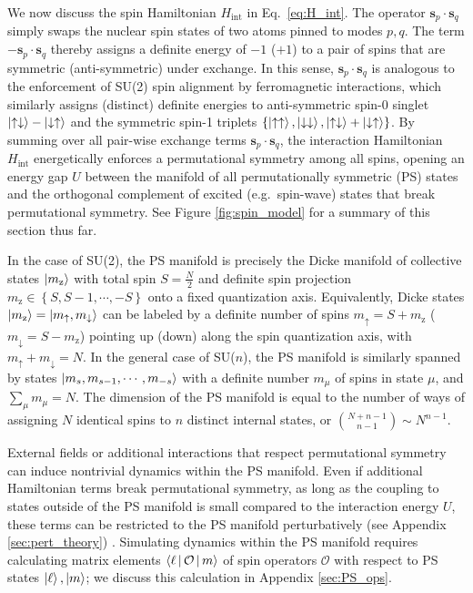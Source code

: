 \documentclass[nofootinbib,twocolumn]{revtex4-2}
\renewcommand{\t}{\text} %
\renewcommand{\set}[1]{\left\{#1\right\}} %
\newcommand{\bk}{\Braket} %
\renewcommand{\v}{\bm} %
\renewcommand{\c}{\cdot} %
\newcommand{\1}{\mathds{1}}
\newcommand{\up}{\uparrow}
\newcommand{\dn}{\downarrow}
\newcommand{\z}{\text{z}}
\renewcommand{\O}{\mathcal{O}}
\begin{document}
We now discuss the spin Hamiltonian $H_{\t{int}}$ in Eq.~\eqref{eq:H_int}.
The operator $\v s_p\c\v s_q$ simply swaps the nuclear spin states of two atoms pinned to modes $p,q$.
The term $-\v s_p\c\v s_q$ thereby assigns a definite energy of $-1$ ($+1$) to a pair of spins that are symmetric (anti-symmetric) under exchange.
In this sense, $\v s_p\c\v s_q$ is analogous to the enforcement of SU(2) spin alignment by ferromagnetic interactions, which similarly assigns (distinct) definite energies to anti-symmetric spin-0 singlet $\ket{\up\dn}-\ket{\dn\up}$ and the symmetric spin-1 triplets $\set{\ket{\up\up},\ket{\dn\dn},\ket{\up\dn}+\ket{\dn\up}}$.
By summing over all pair-wise exchange terms $\v s_p\c\v s_q$, the interaction Hamiltonian $H_{\t{int}}$ energetically enforces a permutational symmetry among all spins, opening an energy gap $U$ between the manifold of all permutationally symmetric (PS) states and the orthogonal complement of excited (e.g.~spin-wave) states that break permutational symmetry.
See Figure \ref{fig:spin_model} for a summary of this section thus far.

In the case of SU(2), the PS manifold is precisely the Dicke manifold of collective states $\ket{m_\z}$ with total spin $S=\frac{N}{2}$ and definite spin projection $m_\z\in\set{S,S-1,\cdots,-S}$ onto a fixed quantization axis.
Equivalently, Dicke states $\ket{m_\z}=\ket{m_\up,m_\dn}$ can be labeled by a definite number of spins $m_\up=S+m_\z$ ($m_\dn=S-m_\z$) pointing up (down) along the spin quantization axis, with $m_\up+m_\dn=N$.
In the general case of SU($n$), the PS manifold is similarly spanned by states $\ket{m_s,m_{s-1},\cdots,m_{-s}}$ with a definite number $m_\mu$ of spins in state $\mu$, and $\sum_\mu m_\mu=N$.
The dimension of the PS manifold is equal to the number of ways of assigning $N$ identical spins to $n$ distinct internal states, or ${N+n-1 \choose n-1} \sim N^{n-1}$.

External fields or additional interactions that respect permutational symmetry can induce nontrivial dynamics within the PS manifold.
Even if additional Hamiltonian terms break permutational symmetry, as long as the coupling to states outside of the PS manifold is small compared to the interaction energy $U$, these terms can be restricted to the PS manifold perturbatively (see Appendix \ref{sec:pert_theory}) \cite{bravyi2011schrieffer}.
Simulating dynamics within the PS manifold requires calculating matrix elements $\bk{\ell|\O|m}$ of spin operators $\O$ with respect to PS states $\ket\ell,\ket{m}$; we discuss this calculation in Appendix \ref{sec:PS_ops}.
\end{document}
